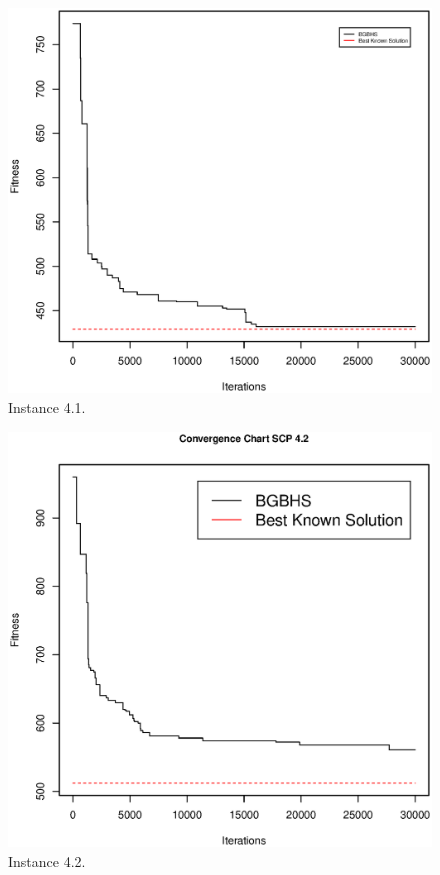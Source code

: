 \begin{figure}[]
\centering
\includegraphics[scale=.45]{Resultados/scp41.eps}
\caption{Instance 4.1.}
\label{fig:Instance.4.1}
\end{figure}


\begin{figure}[]
\centering
\includegraphics[scale=.45]{Resultados/scp42.eps}
\caption{Instance 4.2.}
\label{fig:Instance.4.2}
\end{figure}

